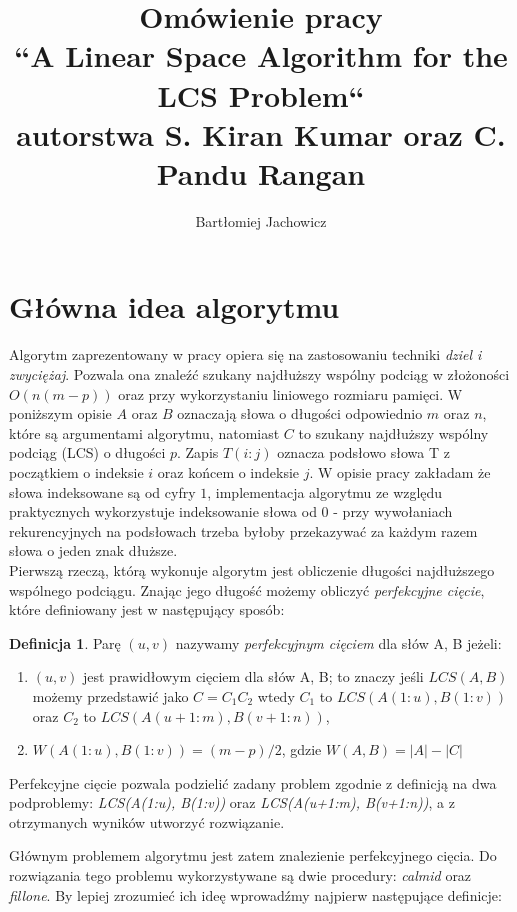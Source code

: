 \documentclass[12pt]{article}
\title{Omówienie pracy\\
``A Linear Space Algorithm for the LCS Problem``\\
autorstwa S. Kiran Kumar oraz C. Pandu Rangan
}
\author{Bartłomiej Jachowicz}
\date{}
\theoremstyle{definition}
\newtheorem{definition}{Definicja}[section]
\theoremstyle{definition}
\theoremstyle{definition}
\begin{document}
\maketitle

\section{Główna idea algorytmu}
Algorytm zaprezentowany w pracy opiera się na zastosowaniu techniki \textit{dziel i zwyciężaj}. Pozwala ona znaleźć szukany najdłuższy wspólny podciąg w złożoności $O(n(m - p))$ oraz przy wykorzystaniu liniowego rozmiaru pamięci. W poniższym opisie $A$ oraz $B$ oznaczają słowa o długości odpowiednio $m$ oraz $n$, które są argumentami algorytmu, natomiast $C$ to szukany najdłuższy wspólny podciąg (LCS) o długości $p$. Zapis $T(i:j)$ oznacza podsłowo słowa T z początkiem o indeksie $i$ oraz końcem o indeksie $j$. W opisie pracy zakładam że słowa indeksowane są od cyfry $1$, implementacja algorytmu ze względu praktycznych wykorzystuje indeksowanie słowa od $0$ - przy wywołaniach rekurencyjnych na podsłowach trzeba byłoby przekazywać za każdym razem słowa o jeden znak dłuższe.\\

Pierwszą rzeczą, którą wykonuje algorytm jest obliczenie długości najdłuższego wspólnego podciągu. Znając jego długość możemy obliczyć \textit{perfekcyjne cięcie}, które definiowany jest w następujący sposób:

\begin{definition}{}
Parę $(u, v)$ nazywamy \textit{perfekcyjnym cięciem} dla słów A, B jeżeli:
\begin{enumerate}
    \item $(u, v)$ jest prawidłowym cięciem dla słów A, B; to znaczy jeśli $LCS(A, B)$ możemy przedstawić jako $C = C_1C_2$ wtedy $C_1$ to $LCS(A(1:u), B(1:v))$ oraz $C_2$ to $LCS(A(u+1:m), B(v+1:n))$,
    \item $W(A(1:u), B(1:v)) = (m - p)/2$, gdzie $W(A, B) = |A| - |C|$
\end{enumerate}
\end{definition}

Perfekcyjne cięcie pozwala podzielić zadany problem zgodnie z definicją na dwa podproblemy: \textit{LCS(A(1:u), B(1:v))} oraz \textit{LCS(A(u+1:m), B(v+1:n))}, a z otrzymanych wyników utworzyć rozwiązanie.

Głównym problemem algorytmu jest zatem znalezienie perfekcyjnego cięcia. Do rozwiązania tego problemu wykorzystywane są dwie procedury: \textit{calmid} oraz \textit{fillone}. By lepiej zrozumieć ich ideę wprowadźmy najpierw następujące definicje:
\end{document}
